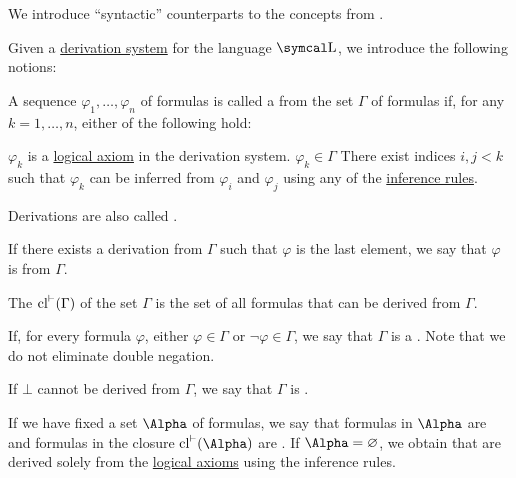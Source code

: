 \begin{definition}\label{def:first_order_proofs}
  We introduce \enquote{syntactic} counterparts to the concepts from .

  Given a \hyperref[def:first_order_derivation_system]{derivation system} for the language \( \CL \), we introduce the following notions:
  \begin{DefEnum}
    A sequence \( \varphi_1, \ldots, \varphi_n \) of formulas is called a  from the set \( \Gamma \) of formulas if, for any \( k = 1, \ldots, n \), either of the following hold:
    \begin{DefEnum}
       \( \varphi_k \) is a \hyperref[def:first_order_derivation_system/axioms]{logical axiom} in the derivation system.
       \( \varphi_k \in \Gamma \)
       There exist indices \( i, j < k \) such that \( \varphi_k \) can be inferred from \( \varphi_i \) and \( \varphi_j \) using any of the \hyperref[def:first_order_derivation_system/rules]{inference rules}.
    \end{DefEnum}

    Derivations are also called .

     If there exists a derivation from \( \Gamma \) such that \( \varphi \) is the last element, we say that \( \varphi \) is  from \( \Gamma \).

     The  \( \operatorname{cl}^{\vdash}(\Gamma) \) of the set \( \Gamma \) is the set of all formulas that can be derived from \( \Gamma \).

    If, for every formula \( \varphi \), either \( \varphi \in \Gamma \) or \( \neg \varphi \in \Gamma \), we say that \( \Gamma \) is a . Note that we do not eliminate double negation.

    If \( \bot \) cannot be derived from \( \Gamma \), we say that \( \Gamma \) is .

     If we have fixed a set \( \Alpha \) of formulas, we say that formulas in \( \Alpha \) are  and formulas in the closure \( \Cl^{\vdash}(\Alpha) \) are . If \( \Alpha = \varnothing \), we obtain  that are derived solely from the \hyperref[logical axioms]{logical axioms} using the inference rules.
  \end{DefEnum}
\end{definition}

